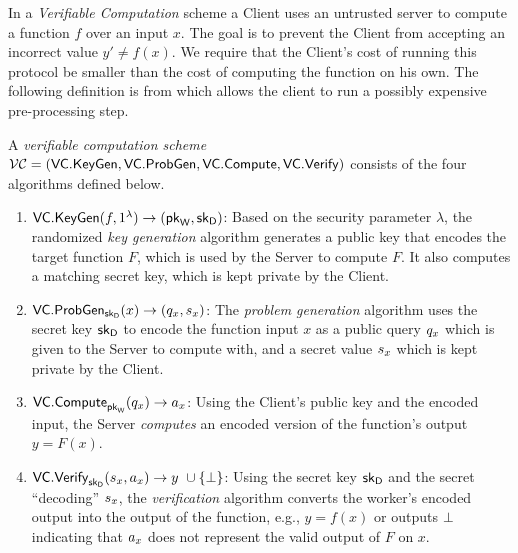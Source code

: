 In a {\em Verifiable Computation} scheme a Client uses an untrusted server to compute a function $f$ over an input $x$. The goal is to prevent the Client from accepting an incorrect value $y'\neq f(x)$. We require that the Client's cost of running this protocol be smaller than the cost of computing the function on his own. The following definition is from \cite{ggp10} which allows the client to run a possibly expensive pre-processing step. 

\begin{definition}

A \emph{verifiable computation scheme} ${\cal VC} =
(\mathsf{VC.KeyGen},\mathsf{VC.ProbGen},\mathsf{VC.Compute},\mathsf{VC.Verify})$ consists of the four
algorithms defined below.  

\begin{enumerate}
\item $\mathsf{VC.KeyGen}(f, 1^\lambda) \to (\mathsf{pk}_{\mathsf{W}}, \mathsf{sk}_{\mathsf{D}})$: 
      Based on the security parameter $\lambda$, the randomized \emph{key generation} 
      algorithm generates a public key that encodes the target function $F$, 
      which is used by the Server to compute $F$. It also 
      computes a matching secret key, which is kept private by the Client. 

\item $\mathsf{VC.ProbGen}_{\mathsf{sk}_{\mathsf{D}}}(x) \to (q_x,s_x)$:
      The \emph{problem generation} algorithm uses the secret key $\mathsf{sk}_{\mathsf{D}}$ to encode the 
      function input $x$ as a public query $q_x$ which is given to the Server
      to compute with, and a secret value $s_x$ 
      which is kept private by the Client. 

\item $\mathsf{VC.Compute}_{\mathsf{pk}_{\mathsf{W}}}(q_x) \to a_x$: 
      Using the Client's public key and the encoded input, the Server  \emph{computes} 
      an encoded version of the function's output $y = F(x)$. 

\item $\mathsf{VC.Verify}_{\mathsf{sk}_{\mathsf{D}}}(s_x,a_x) \to y\mbox{ }\cup \{ \bot \}$:
      Using the secret key $\mathsf{sk}_{\mathsf{D}}$ and the secret ``decoding'' $s_x$, the 
      \emph{verification} algorithm converts the worker's encoded output into 
      the output of the function, e.g., $y = f(x)$ or outputs $\bot$ indicating
      that $a_x$ does not represent the valid output of $F$ on $x$.
\end{enumerate}      


\end{definition}
